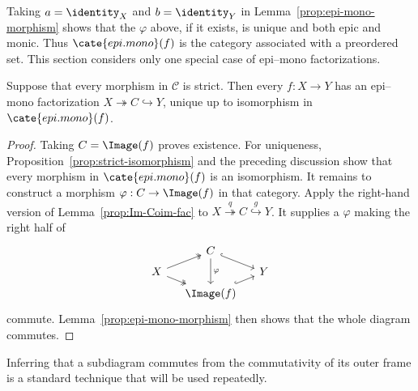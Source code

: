 Taking $a=\identity_X$ and $b=\identity_Y$ in Lemma~\ref{prop:epi-mono-morphism} shows that the $\varphi$ above, if it exists, is unique and both epic and monic. Thus $\cate{epi.mono}(f)$ is the category associated with a preordered set. This section considers only one special case of epi--mono factorizations.

\begin{proposition}\label{prop:epi-mono-uniqueness}
	Suppose that every morphism in $\mathcal C$ is strict. Then every $f:X\to Y$ has an epi--mono factorization $X\twoheadrightarrow C\hookrightarrow Y$, unique up to isomorphism in $\cate{epi.mono}(f)$.
\end{proposition}

\begin{proof}
	Taking $C=\Image(f)$ proves existence. For uniqueness, Proposition~\ref{prop:strict-isomorphism} and the preceding discussion show that every morphism in $\cate{epi.mono}(f)$ is an isomorphism. It remains to construct a morphism $\varphi:C\to\Image(f)$ in that category. Apply the right-hand version of Lemma~\ref{prop:Im-Coim-fac} to $X\stackrel q\twoheadrightarrow C\stackrel g\hookrightarrow Y$. It supplies a $\varphi$ making the right half of
	\[\begin{tikzcd}[row sep=tiny, column sep=small]
		& C \arrow[hookrightarrow, rd] \arrow[dd, "\varphi"] & \\
		X \arrow[twoheadrightarrow, ru] \arrow[twoheadrightarrow, rd] & & Y \\
		& \Image(f) \arrow[hookrightarrow, ru] &
	\end{tikzcd}\]
	commute. Lemma~\ref{prop:epi-mono-morphism} then shows that the whole diagram commutes.
\end{proof}

Inferring that a subdiagram commutes from the commutativity of its outer frame is a standard technique that will be used repeatedly.
